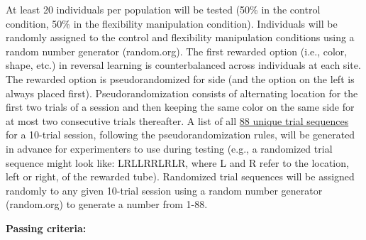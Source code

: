 \documentclass[
]{article}
\begin{document}
At least 20 individuals per population will be tested (50\% in the
control condition, 50\% in the flexibility manipulation condition).
Individuals will be randomly assigned to the control and flexibility
manipulation conditions using a random number generator (random.org).
The first rewarded option (i.e., color, shape, etc.) in reversal
learning is counterbalanced across individuals at each site. The
rewarded option is pseudorandomized for side (and the option on the left
is always placed first). Pseudorandomization consists of alternating
location for the first two trials of a session and then keeping the same
color on the same side for at most two consecutive trials thereafter. A
list of all
\href{https://docs.google.com/spreadsheets/d/1B3-ZKd4nr_4gA91Pu2eUUBOriwW-V88VRgK9c1lDSjY/edit?usp=sharing}{88
unique trial sequences} for a 10-trial session, following the
pseudorandomization rules, will be generated in advance for
experimenters to use during testing (e.g., a randomized trial sequence
might look like: LRLLRRLRLR, where L and R refer to the location, left
or right, of the rewarded tube). Randomized trial sequences will be
assigned randomly to any given 10-trial session using a random number
generator (random.org) to generate a number from 1-88.

\textbf{Passing criteria:}
\end{document}
